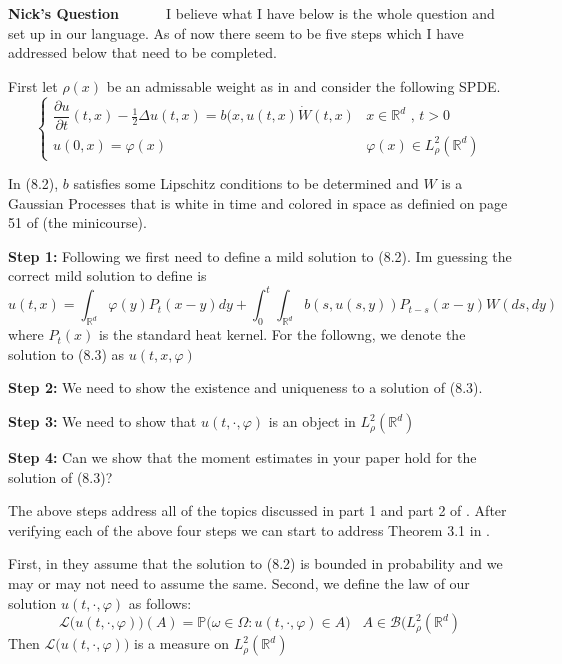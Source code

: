 \documentclass[a4paper,11pt]{article}
\theoremstyle{plain}
\theoremstyle{definition}
\newcounter{NQ}
\newenvironment{NickQuestion}[1][] %
  {\refstepcounter{NQ}
  \begin{mdframed}[backgroundcolor=lightgray]\textbf{Nick's Question \theNQ \: #1~~}~~~\noindent}%
  {\end{mdframed}}
\numberwithin{NQ}{section}
\numberwithin{LQ}{section}
\numberwithin{ZQ}{section}
\begin{document}
\begin{NickQuestion}
I believe what I have below is the whole question and set up in our language. As of now there seem to be five steps which I have addressed below that need to be completed.  

First let $\rho(x)$ be an admissable weight as in \cite{TessitoreZabczyk98M} and consider the following SPDE.
\begin{equation}
\begin{cases}
   \dfrac{\partial u}{\partial t}(t,x)-\frac{1}{2}\Delta u(t,x) = b(x,u(t,x)\dot W(t,x) & \text{$x\in \mathbb R^d$ , $t>0$}
   \\ u(0,x)=\varphi(x) & \varphi(x) \in L^2_\rho(\mathbb R^d)
\end{cases}  
\end{equation}

In (8.2), $b$ satisfies some Lipschitz conditions to be determined and $W$ is a Gaussian Processes that is white in time and colored in space as definied on page 51 of \cite{DalangEtc09Minicourse}(the minicourse).

\textbf{Step 1:} Following \cite{TessitoreZabczyk98M} we first need to define a mild solution to (8.2). Im guessing the correct mild solution to define is 
\begin{equation}
    u(t,x)=\int_{\mathbb R^d}\varphi (y)P_t(x-y)dy + \int_0^t\int_{\mathbb R^d}b(s,u(s,y))P_{t-s}(x-y)W(ds,dy)
\end{equation}
where $P_t(x)$ is the standard heat kernel. For the followng, we denote the solution to (8.3) as $u(t,x,\varphi)$

\textbf{Step 2:} We need to show the existence and uniqueness to a solution of (8.3).

\textbf{Step 3:} We need to show that $u(t,\cdot,\varphi)$ is an object in $L^2_\rho(\mathbb R^d)$

\textbf{Step 4:} Can we show that the moment estimates in your paper \cite{ChenDalang13Heat} hold for the solution of (8.3)? 

\vspace{.2in} 
The above steps address all of the topics discussed in part 1 and part 2 of \cite{TessitoreZabczyk98M}. After verifying each of the above four steps we can start to address Theorem 3.1 in \cite{TessitoreZabczyk98M}. 
\vspace{.2in}

First, in \cite{TessitoreZabczyk98M} they assume that the solution to (8.2) is bounded in probability and we may or may not need to assume the same. Second,  we define the law of our solution $u(t,\cdot,\varphi)$ as follows: 
\begin{equation}
    \mathscr L\big(u(t,\cdot,\varphi)\big)(A)=\mathbb P \big(\omega \in \Omega : u(t,\cdot,\varphi) \in A\big) \;\;\; A \in \mathscr B(L^2_\rho(\mathbb R^d)
\end{equation}
Then $\mathscr L\big(u(t,\cdot,\varphi)\big)$ is a measure on $L^2_\rho(\mathbb R^d)$


\end{NickQuestion}
\end{document}
